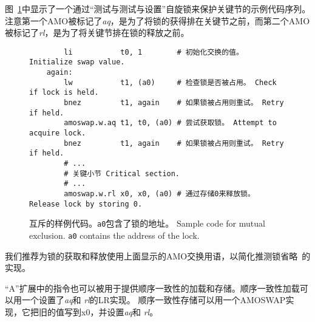 图~\ref{critical}中显示了一个通过“测试与测试与设置”自旋锁来保护关键节的示例代码序列。
注意第一个AMO被标记了{\em aq}，是为了将锁的获得排在关键节之前，而第二个AMO被标记了{\em rl}，是为了将关键节排在锁的释放之前。

\begin{figure}[h!]
\begin{center}
\begin{verbatim}
        li           t0, 1        # 初始化交换的值。 Initialize swap value.
    again:
        lw           t1, (a0)     # 检查锁是否被占用。 Check if lock is held.
        bnez         t1, again    # 如果锁被占用则重试。 Retry if held.
        amoswap.w.aq t1, t0, (a0) # 尝试获取锁。 Attempt to acquire lock.
        bnez         t1, again    # 如果锁被占用则重试。 Retry if held.
        # ...
        # 关键小节 Critical section.
        # ...
        amoswap.w.rl x0, x0, (a0) # 通过存储0来释放锁。 Release lock by storing 0.
\end{verbatim}
\end{center}
\caption{互斥的样例代码。{\tt a0}包含了锁的地址。 Sample code for mutual exclusion.  {\tt a0} contains the address of the lock.}
\label{critical}
\end{figure}

\begin{commentary}
  我们推荐为锁的获取和释放使用上面显示的AMO交换用语，以简化推测锁省略~\cite{Rajwar:2001:SLE}的实现。
\end{commentary}

“A”扩展中的指令也可以被用于提供顺序一致性的加载和存储。顺序一致性加载可以用一个设置了{\em aq}和 {\em rl}的LR实现。
顺序一致性存储可以用一个AMOSWAP实现，它把旧的值写到x0，并设置{\em aq}和 {\em rl}。
